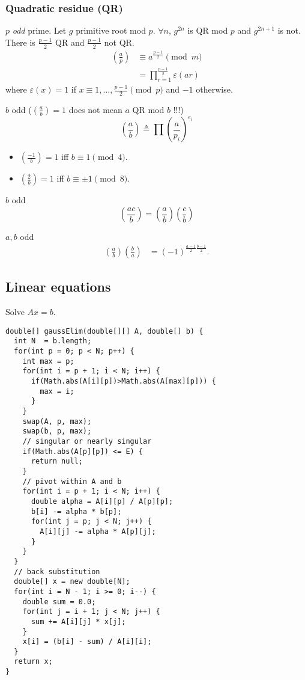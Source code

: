 \subsubsection{Quadratic residue (QR)}
$p$ \emph{odd} prime.
Let $g$ primitive root mod $p$.
$\forall n$, $g^{2n}$ is QR mod $p$ and $g^{2n+1}$ is not.
There is $\frac{p-1}{2}$ QR and $\frac{p-1}{2}$ not QR.
\begin{align*}
  \left(\frac{a}{p}\right) & \equiv a^{\frac{p-1}{2}} \pmod{m}\\
                           & = \prod_{r=1}^{\frac{p-1}{2}} \varepsilon(ar)
\end{align*}
where $\varepsilon(x) = 1$ if $x \equiv 1, \ldots, \frac{p-1}{2} \pmod{p}$ and $-1$ otherwise.

$b$ odd ($\left(\frac{a}{b}\right)=1$ does not mean $a$ QR mod $b$ !!!)
\[ \left(\frac{a}{b}\right) \triangleq \prod \left(\frac{a}{p_i}\right)^{e_i} \]
\begin{itemize}
  \item $\left(\frac{-1}{b}\right) = 1$ iff $b \equiv 1 \pmod{4}$.
  \item $\left(\frac{2}{b}\right) = 1$ iff $b \equiv \pm 1 \pmod{8}$.
\end{itemize}

$b$ odd
\[ \left(\frac{ac}{b}\right) = \left(\frac{a}{b}\right)\left(\frac{c}{b}\right) \]

$a,b$ odd
\begin{align*}
  \left(\frac{a}{b}\right)\left(\frac{b}{a}\right) & = (-1)^{\frac{a-1}{2}\frac{b-1}{2}}.
\end{align*}



\subsection{Linear equations}

Solve $Ax = b$. \\

\begin{lstlisting}
double[] gaussElim(double[][] A, double[] b) {
  int N  = b.length;
  for(int p = 0; p < N; p++) {
    int max = p;
    for(int i = p + 1; i < N; i++) {
      if(Math.abs(A[i][p])>Math.abs(A[max][p])) {
        max = i;
      } 
    }
    swap(A, p, max);
    swap(b, p, max);
    // singular or nearly singular
    if(Math.abs(A[p][p]) <= E) {
      return null;
    }
    // pivot within A and b
    for(int i = p + 1; i < N; i++) {
      double alpha = A[i][p] / A[p][p];
      b[i] -= alpha * b[p];
      for(int j = p; j < N; j++) {
        A[i][j] -= alpha * A[p][j];
      }
    }
  }
  // back substitution
  double[] x = new double[N];
  for(int i = N - 1; i >= 0; i--) {
    double sum = 0.0;
    for(int j = i + 1; j < N; j++) {
      sum += A[i][j] * x[j];
    }
    x[i] = (b[i] - sum) / A[i][i];
  }
  return x;
}
\end{lstlisting}

